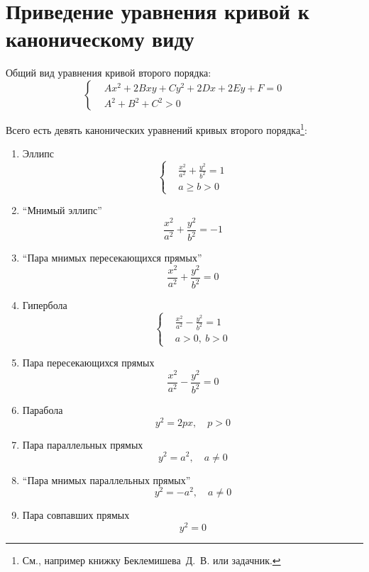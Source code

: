 \documentclass[a4paper,12pt]{article}
\begin{document}
  \section{Приведение уравнения кривой к каноническому виду}
  
  Общий вид уравнения кривой второго порядка:
  \begin{equation}\label{eq:second-order-curve}
    \left\{
      \begin{aligned}
        &Ax^2 + 2B xy + Cy^2 + 2Dx + 2Ey + F = 0\\
        &A^2 + B^2 + C^2 > 0
      \end{aligned}
    \right.
  \end{equation}
  
  Всего есть девять канонических уравнений кривых второго порядка\footnote{См., например книжку Беклемишева~Д.~В. или задачник.}:
  \begin{enumerate}
    \item\label{enum:ellipse} Эллипс
      \[
        \left\{
          \begin{aligned}
            &\frac{x^2}{a^2} + \frac{y^2}{b^2} = 1\\
            &a \geq b > 0
          \end{aligned}
        \right.
      \]
    \item ``Мнимый эллипс''
      \[
        \frac{x^2}{a^2} + \frac{y^2}{b^2} = -1
      \]
    \item ``Пара мнимых пересекающихся прямых''
      \[
        \frac{x^2}{a^2} + \frac{y^2}{b^2} = 0
      \]
    \item\label{enum:hyperbola} Гипербола
      \[
        \left\{
          \begin{aligned}
            &\frac{x^2}{a^2} - \frac{y^2}{b^2} = 1\\
            &a > 0,\ b > 0
          \end{aligned}
        \right.
      \]
    \item Пара пересекающихся прямых
      \[
        \frac{x^2}{a^2} - \frac{y^2}{b^2} = 0
      \]
    \item\label{enum:parabola} Парабола
      \[
        y^2 = 2px, \quad p > 0
      \]
    \item Пара параллельных прямых
      \[
        y^2 = a^2,\quad a \not= 0
      \]
    \item ``Пара мнимых параллельных прямых''
      \[
        y^2 = -a^2,\quad a \not= 0
      \]
    \item Пара совпавших прямых
      \[
        y^2 = 0
      \]
  \end{enumerate}
  
\end{document}
